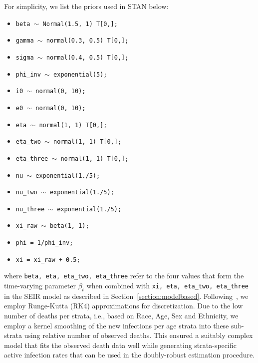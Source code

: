 \documentclass[11pt]{amsart}
\numberwithin{equation}{section}
\theoremstyle{plain}
\def\code#1{\texttt{#1}}
\begin{document}
For simplicity, we list the priors used in STAN below:
\begin{itemize}
  \item \code{beta $\sim$ Normal(1.5, 1) T[0,];}
  \item \code{gamma $\sim$ normal(0.3, 0.5) T[0,];}
  \item \code{sigma $\sim$ normal(0.4, 0.5) T[0,];}
  \item \code{phi\_inv $\sim$ exponential(5);}
  \item \code{i0 $\sim$ normal(0, 10);}
  \item \code{e0 $\sim$ normal(0, 10);}
  \item \code{eta $\sim$ normal(1, 1) T[0,];}
  \item \code{eta\_two $\sim$ normal(1, 1) T[0,];}
  \item \code{eta\_three $\sim$ normal(1, 1) T[0,];}
  \item \code{nu $\sim$ exponential(1./5);}
  \item \code{nu\_two $\sim$ exponential(1./5);}
  \item \code{nu\_three $\sim$ exponential(1./5);}
  \item \code{xi\_raw $\sim$ beta(1, 1);}
  \item \code{phi = 1/phi\_inv;}
  \item \code{xi = xi\_raw + 0.5;}
\end{itemize}
where \code{beta, eta, eta\_two, eta\_three} refer to the four values that form the time-varying parameter $\beta_t$ when combined with \code{xi, eta, eta\_two, eta\_three} in the SEIR model as described in Section~\ref{section:modelbased}. Following~\cite{Song2020}, we employ Runge-Kutta (RK4) approximations for discretization.  Due to the low number of deaths per strata, i.e., based on Race, Age, Sex and Ethnicity, we employ a kernel smoothing of the new infections per age strata into these sub-strata using relative number of observed deaths.  This ensured a suitably complex model that fits the observed death data well while generating strata-specific active infection rates that can be used in the doubly-robust estimation procedure.
\end{document}
